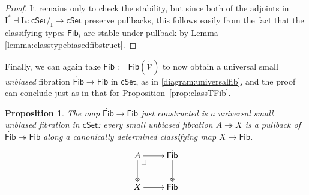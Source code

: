 \documentclass[11pt,reqno]{amsart}
\makeatletter
\newcommand{\cSet}{\ensuremath{\mathsf{cSet}}}
\newcommand{\slice}[1]{\ensuremath{/_{\!{#1}}}}
\newcommand{\ra}{\ensuremath{\rightarrow}}
\newcommand{\fib}{\ensuremath{\twoheadrightarrow}}
\newcommand{\I}{\ensuremath{\mathrm{I}}}
\newcommand{\VV}{\ensuremath{\dot{\mathcal{V}}}}
\newcommand{\Fib}{\ensuremath{\mathsf{Fib}}}
\newcommand{\FFib}{\ensuremath{\dot{\mathsf{Fib}}}}
\newtheorem{proposition}[theorem]{Proposition}
\theoremstyle{remark}
\theoremstyle{definition}
\newcommand{\pbcorner}[1][dr]{\save*!/#1-1.2pc/#1:(-1,1)@^{|-}\restore}
\makeatother
\begin{document}
\begin{proof} It remains only to check the stability, but since both of the adjoints in $\I^* \dashv \I_* : \cSet\slice{\I} \ra\cSet$ preserve pullbacks, this follows easily from the fact that the classifying types $\Fib_i$ are stable under pullback by Lemma \ref{lemma:classtypebiasedfibstruct}.
\end{proof}

Finally, we can again take $\Fib := \Fib(\VV)$ to now obtain a universal small \emph{unbiased} fibration $\FFib\ra\Fib$ in $\cSet$, as in \eqref{diagram:universalfib}, and the proof can conclude just as in that for Proposition~\ref{prop:classTFib}.  

\begin{proposition}\label{prop:UniversalunbiasedFib}
The map $\FFib\ra\Fib$ just constructed is a \emph{universal small unbiased fibration} in $\cSet$: every small unbiased fibration $A \fib X$ is a pullback of $\FFib \fib \Fib$ along a canonically determined classifying map $X\ra \Fib$.
\begin{equation}\label{diagram:classifyfib2}
\xymatrix{
A \ar@{>>}[d] \ar[r]  \pbcorner & \FFib \ar@{>>}[d] \\
X \ar[r] & \Fib
}
\end{equation}
\end{proposition}
\end{document}
